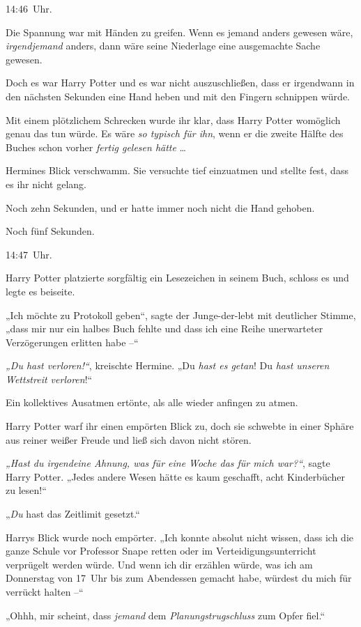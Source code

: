 14:46~Uhr. 

Die Spannung war mit Händen zu greifen. Wenn es jemand anders gewesen wäre, \emph{irgendjemand} anders, dann wäre seine Niederlage eine ausgemachte Sache gewesen. 

Doch es war Harry Potter und es war nicht auszuschließen, dass er irgendwann in den nächsten Sekunden eine Hand heben und mit den Fingern schnippen würde. 

Mit einem plötzlichem Schrecken wurde ihr klar, dass Harry Potter womöglich genau das tun würde. Es wäre \emph{so typisch für ihn}, wenn er die zweite Hälfte des Buches schon vorher \emph{fertig gelesen hätte} … 

Hermines Blick verschwamm. Sie versuchte tief einzuatmen und stellte fest, dass es ihr nicht gelang. 

Noch zehn Sekunden, und er hatte immer noch nicht die Hand gehoben. 

Noch fünf Sekunden. 

14:47~Uhr. 

Harry Potter platzierte sorgfältig ein Lesezeichen in seinem Buch, schloss es und legte es beiseite. 

„Ich möchte zu Protokoll geben“, sagte der Junge-der-lebt mit deutlicher Stimme, „dass mir nur ein halbes Buch fehlte und dass ich eine Reihe unerwarteter Verzögerungen erlitten habe –“ 

\emph{„Du hast verloren!“}, kreischte Hermine. „Du \emph{hast es getan}! Du \emph{hast unseren Wettstreit verloren}!“ 

Ein kollektives Ausatmen ertönte, als alle wieder anfingen zu atmen. 

Harry Potter warf ihr einen empörten Blick zu, doch sie schwebte in einer Sphäre aus reiner weißer Freude und ließ sich davon nicht stören. 

\emph{„Hast du irgendeine Ahnung, was für eine Woche das für mich war?“}, sagte Harry Potter. „Jedes andere Wesen hätte es kaum geschafft, acht Kinderbücher zu lesen!“ 

„\emph{Du} hast das Zeitlimit gesetzt.“ 

Harrys Blick wurde noch empörter. „Ich konnte absolut nicht wissen, dass ich die ganze Schule vor Professor Snape retten oder im Verteidigungsunterricht verprügelt werden würde. Und wenn ich dir erzählen würde, was ich am Donnerstag von 17~Uhr bis zum Abendessen gemacht habe, würdest du mich für verrückt halten –“ 

„Ohhh, mir scheint, dass \emph{jemand} dem \emph{Planungstrugschluss} zum Opfer fiel.“ 

